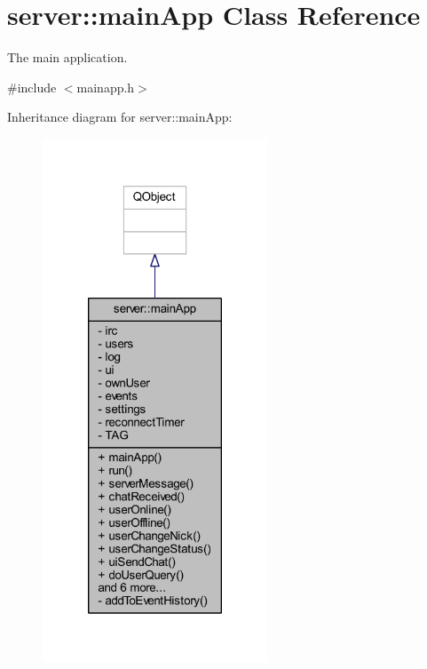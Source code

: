 \hypertarget{classserver_1_1main_app}{\section{server\-:\-:main\-App Class Reference}
\label{d1/d48/classserver_1_1main_app}
}


The main application.  




{\ttfamily \#include $<$mainapp.\-h$>$}



Inheritance diagram for server\-:\-:main\-App\-:\nopagebreak
\begin{figure}[H]
\begin{center}
\leavevmode
\includegraphics[width=190pt]{d9/d6d/classserver_1_1main_app__inherit__graph}
\end{center}
\end{figure}


